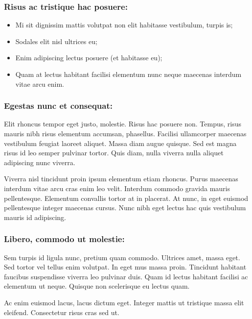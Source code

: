 \documentclass[
]{HyperedReport}
\begin{document}
\subsubsection{Risus ac tristique hac posuere:}

\begin{itemize}
	\item Mi sit dignissim mattis volutpat non elit habitasse vestibulum, turpis is;
	\item Sodales elit nisl ultrices eu;
	\item Enim adipiscing lectus posuere (et habitasse eu);
	\item Quam at lectus habitant facilisi elementum nunc neque maecenas interdum vitae arcu enim.
\end{itemize}

\subsubsection{Egestas nunc et consequat:}

Elit rhoncus tempor eget justo, molestie. Risus hac posuere non. Tempus, risus mauris nibh risus elementum accumsan, phasellus. Facilisi ullamcorper maecenas vestibulum feugiat laoreet aliquet. Massa diam augue quisque. Sed est magna risus id leo semper pulvinar tortor. Quis diam, nulla viverra nulla aliquet adipiscing nunc viverra.

Viverra nisl tincidunt proin ipsum elementum etiam rhoncus. Purus maecenas interdum vitae arcu cras enim leo velit. Interdum commodo gravida mauris pellentesque. Elementum convallis tortor at in placerat. At nunc, in eget euismod pellentesque integer maecenas cursus. Nunc nibh eget lectus hac quis vestibulum mauris id adipiscing.

\subsubsection{Libero, commodo ut molestie:}

Sem turpis id ligula nunc, pretium quam commodo. Ultrices amet, massa eget. Sed tortor vel tellus enim volutpat. In eget mus massa proin. Tincidunt habitant faucibus suspendisse viverra leo pulvinar duis. Quam id lectus habitant facilisi ac elementum ut neque. Quisque non scelerisque eu lectus quam.

Ac enim euismod lacus, lacus dictum eget. Integer mattis ut tristique massa elit eleifend. Consectetur risus cras sed ut.
\end{document}
